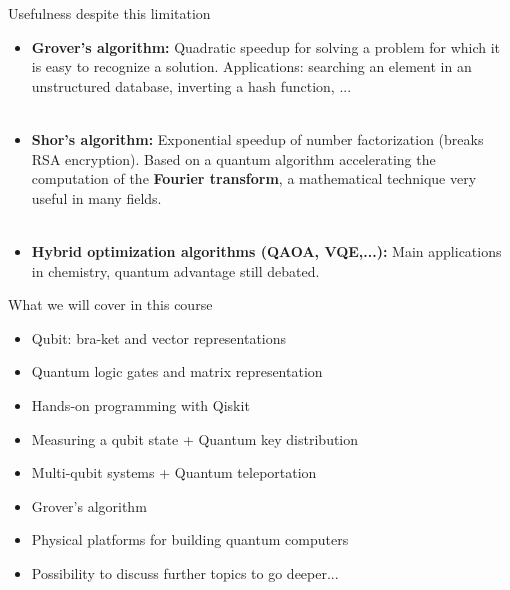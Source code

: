 \documentclass[aspectratio=169,12pt]{beamer}
\begin{document}
\begin{frame}{Usefulness despite this limitation}
  \begin{itemize}
    \item {\bf Grover's algorithm:} Quadratic speedup for solving a problem for which it is easy to recognize a solution. Applications: searching an element in an unstructured database, inverting a hash function, ... \\~\\
    \item {\bf Shor's algorithm:} Exponential speedup of number factorization (breaks RSA encryption). Based on a quantum algorithm accelerating the computation of the {\bf Fourier transform}, a mathematical technique very useful in many fields. \\~\\
    \item {\bf Hybrid optimization algorithms (QAOA, VQE,...):} Main applications in chemistry, quantum advantage still debated.
  \end{itemize}
\end{frame}

\begin{frame}{What we will cover in this course}
  
  \begin{itemize}
    \setlength{\itemsep}{0.8em}
    \item Qubit: bra-ket and vector representations
    \item Quantum logic gates and matrix representation
    \item Hands-on programming with Qiskit
    \item Measuring a qubit state + Quantum key distribution
    \item Multi-qubit systems + Quantum teleportation
    \item Grover's algorithm
    \item Physical platforms for building quantum computers
    \item Possibility to discuss further topics to go deeper...
  \end{itemize}
\end{frame}
\end{document}
